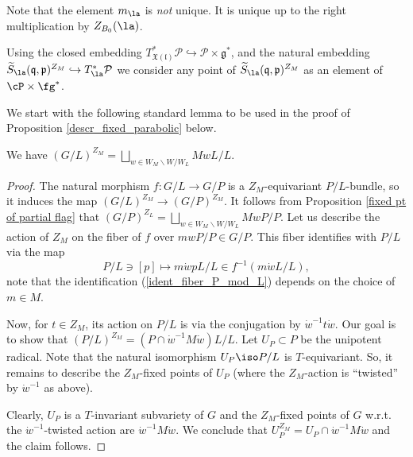 \documentclass[12pt]{amsart}
\begin{document}
\begin{rmk}
Note that the element $m_\la$ is {\emph{not}} unique. It is unique up to the right multiplication by $Z_{B_0}(\la)$.
\end{rmk}



Using the closed embedding $T^*_{\mathfrak{X}(\mathfrak{l})}\mathcal{P} \hookrightarrow \mathcal{P} \times \mathfrak{g}^*$, and the natural embedding $\widetilde{S}_{\la}(\mathfrak{q},\mathfrak{p})^{Z_M} \hookrightarrow T^*_{\la}\mathcal{P}$ we consider any point of $\widetilde{S}_{\la}(\mathfrak{q},\mathfrak{p})^{Z_M}$ as an element of $\cP\times \fg^*$.


We start with the following standard lemma to be used in the proof of Proposition \ref{descr_fixed_parabolic} below. 

\begin{lemma}\label{lemma_fixed_G_L}
We have  $(G/L)^{Z_M}=\bigsqcup_{w \in W_M \backslash W/W_L} MwL/L$.
\end{lemma}
\begin{proof}
The natural morphism $f\colon G/L \rightarrow G/P$ is a $Z_M$-equivariant $P/L$-bundle, so it induces the map $(G/L)^{Z_M} \rightarrow (G/P)^{Z_M}$. It follows from Proposition \ref{fixed pt of partial flag} that $(G/P)^{Z_L}=\bigsqcup_{w \in W_M \backslash W/W_L}MwP/P$. 
Let us describe the action of $Z_M$ on the fiber of $f$ over $mwP/P \in G/P$. This fiber identifies with  $P/L$ via the map 
\begin{equation}\label{ident_fiber_P_mod_L}
P/L \ni [p] \mapsto m\dot{w}pL/L \in f^{-1}(m\dot{w}L/L),
\end{equation}
note that the identification (\ref{ident_fiber_P_mod_L}) depends on the choice of $m \in M$.


Now, for $t \in Z_M$, its action on $P/L$ is via the conjugation by ${\dot{w}}^{-1}t\dot{w}$. Our goal is to show that $(P/L)^{Z_M}=(P \cap {\dot{w}}^{-1}M\dot{w})L/L$. Let $U_P \subset P$ be the unipotent radical. Note that the natural isomorphism $U_P \iso P/L$ is $T$-equivariant. So, it remains to describe the $Z_M$-fixed points of $U_P$ (where the $Z_M$-action is ``twisted'' by $\dot{w}^{-1}$ as above).

Clearly, $U_P$ is a $T$-invariant subvariety of $G$ and the $Z_M$-fixed points of $G$ w.r.t. the $\dot{w}^{-1}$-twisted action are $\dot{w}^{-1}M\dot{w}$. We conclude that $U_P^{Z_M} = U_P \cap \dot{w}^{-1}M\dot{w}$ and the claim follows.
\end{proof}
\end{document}
